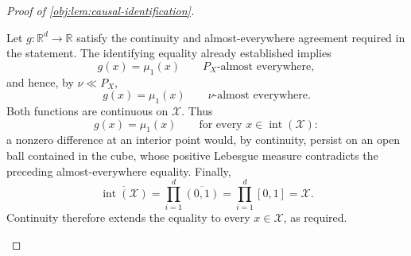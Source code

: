 \begin{proof}[Proof of \cref{obj:lem:causal-identification}]
\begin{enumerate}
Let \(g:\mathbb R^d\to\mathbb R\) satisfy the continuity and almost-everywhere agreement required in the statement. The identifying equality already established implies
\[
g(x)=\mu_1(x)
\qquad P_X\text{-almost everywhere},
\]
and hence, by \(\nu\ll P_X\),
\[
g(x)=\mu_1(x)
\qquad \nu\text{-almost everywhere}.
\]
Both functions are continuous on \(\mathcal X\). Thus
\[
g(x)=\mu_1(x)
\qquad\text{for every }x\in\operatorname{int}(\mathcal X):
\]
a nonzero difference at an interior point would, by continuity, persist on an open ball contained in the cube, whose positive Lebesgue measure contradicts the preceding almost-everywhere equality. Finally,
\[
\overline{\operatorname{int}(\mathcal X)}
=\prod_{i=1}^{d}\overline{(0,1)}
=\prod_{i=1}^{d}[0,1]
=\mathcal X.
\]
Continuity therefore extends the equality to every \(x\in\mathcal X\), as required.
\end{enumerate}
\end{proof}
